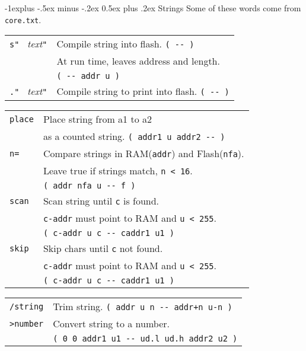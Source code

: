 \documentclass[10pt,landscape,a4paper]{article}
\makeatletter
\renewcommand{\subsection}{\@startsection{subsection}{2}{0mm}%
                                {-1explus -.5ex minus -.2ex}%
                                {0.5ex plus .2ex}%
                                {\normalfont\normalsize\bfseries}}
\newcommand{\compileonly}{\color{blue}}
\makeatother
\begin{document}
\begin{multicols}{3}
\subsection{Strings}
Some of these words come from \verb!core.txt!.
\begin{tabular}{@{}ll@{}}
{\compileonly\verb!s" !} \textit{text}\verb!"! & Compile string into flash. \verb!( -- )! \\
                                 & At run time, leaves address and length. \\
                                 & \verb!( -- addr u )! \\
{\compileonly\verb!." !} \textit{text}\verb!"! & Compile string to print into flash. \verb!( -- )! \\
\end{tabular}
\begin{tabular}{@{}ll@{}}
\verb!place! & Place string from a1 to a2 \\
             & as a counted string. \verb!( addr1 u addr2 -- )! \\
\verb!n=!  & Compare strings in RAM(\verb!addr!) and Flash(\verb!nfa!). \\
           & Leave true if strings match, \verb!n < 16!. \\
           &  \verb!( addr nfa u -- f )! \\
\verb!scan! & Scan string until \verb!c! is found. \\
            & \verb!c-addr! must point to RAM and \verb!u < 255!.\\
            & \verb!( c-addr u c -- caddr1 u1 )! \\
\verb!skip! & Skip chars until \verb!c! not found. \\
            & \verb!c-addr! must point to RAM and \verb!u < 255!.\\
            & \verb!( c-addr u c -- caddr1 u1 )! \\
\end{tabular}
\begin{tabular}{@{}ll@{}}
\verb!/string!  & Trim string. \verb!( addr u n -- addr+n u-n )! \\
\verb!>number!  & Convert string to a number. \\
                & \verb!( 0 0 addr1 u1 -- ud.l ud.h addr2 u2 )! \\

\end{tabular}
\end{multicols}
\end{document}
